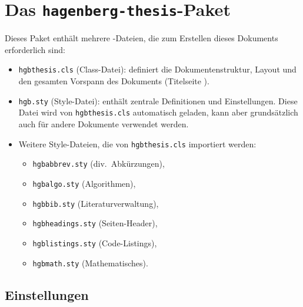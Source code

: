 \section{Das \texttt{hagenberg-thesis}-Paket}

Dieses Paket enthält mehrere \latex-Dateien, die 
zum Erstellen dieses Dokuments erforderlich sind:
%
\begin{itemize}
\item \nolinkurl{hgbthesis.cls} (Class-Datei): definiert die 
		Dokumentenstruktur, Layout und den gesamten Vorspann des Dokuments (Titelseite \etc).
\item \nolinkurl{hgb.sty} (Style-Datei): enthält zentrale Definitionen und Einstellungen. 
		Diese Datei wird von \nolinkurl{hgbthesis.cls} automatisch geladen, kann 
		aber grundsätzlich auch für andere Dokumente verwendet werden.
\item Weitere Style-Dateien, die von \nolinkurl{hgbthesis.cls} importiert werden:
    \begin{itemize}
	\item[] \nolinkurl{hgbabbrev.sty} (div.\ Abkürzungen),
    \item[] \nolinkurl{hgbalgo.sty} (Algorithmen),
	\item[] \nolinkurl{hgbbib.sty} (Literaturverwaltung),
	\item[] \nolinkurl{hgbheadings.sty} (Seiten-Header),
	\item[] \nolinkurl{hgblistings.sty} (Code-Listings),
    \item[] \nolinkurl{hgbmath.sty} (Mathematisches).
    \end{itemize}
\end{itemize}


\subsection{Einstellungen}
\label{sec:HagenbergEinstellungen}


